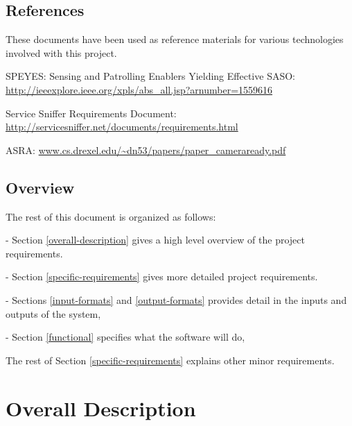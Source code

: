 \documentclass[titlepage]{article}
\begin{document}

\subsection{References%
  \label{references}%
}

These documents have been used as reference materials for various technologies involved with this project.
%
\begin{itemize*}
	\item SPEYES: Sensing and Patrolling Enablers Yielding Effective SASO: \url{http://ieeexplore.ieee.org/xpls/abs_all.jsp?arnumber=1559616}
	\item Service Sniffer Requirements Document: \url{http://servicesniffer.net/documents/requirements.html}
    \item ASRA: \url{www.cs.drexel.edu/~dn53/papers/paper_cameraready.pdf}
\end{itemize*}



\subsection{Overview%
  \label{overview}%
}

The rest of this document is organized as follows: 
\begin{itemize*}
	\item[-]Section \ref{overall-description} gives a high level overview of the project requirements.  
	\item[-]Section \ref{specific-requirements} gives more detailed project requirements.  
	\item[-]Sections \ref{input-formats} and \ref{output-formats} provides detail in the inputs and outputs of the system, 
	\item[-]Section \ref{functional} specifies what the software will do, 
\end{itemize*}
The rest of Section \ref{specific-requirements} explains other minor requirements.



\section{Overall Description%
  \label{overall-description}%
}
\end{document}

